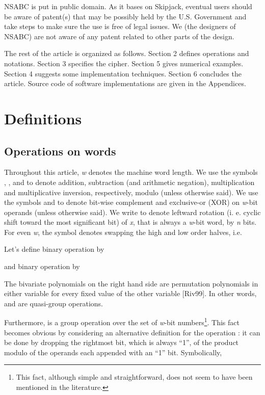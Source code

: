\documentclass[a4paper,oneside,english]{amsart}
\numberwithin{equation}{section}
\numberwithin{figure}{section}
\begin{document}
NSABC is put in public domain. As it bases on Skipjack, eventual users
should be aware of patent(s) that may be possibly held by the U.S.
Government and take steps to make sure the use is free of legal issues.
We (the designers of NSABC) are not aware of any patent related to
other parts of the design.

The rest of the article is organized as follows. Section 2 defines
operations and notations. Section 3 specifies the cipher. Section
5 gives numerical examples. Section 4 suggests some implementation
techniques. Section 6 concludes the article. Source code of software
implementations are given in the Appendices.


\section{Definitions}


\subsection{Operations on words}

Throughout this article, \emph{w} denotes the machine word length.
We use the symbols , ,  and 
to denote addition, subtraction (and arithmetic negation), multiplication
and multiplicative inversion, respectively, modulo  (unless
otherwise said). We use the symbols  and  to denote
bit-wise complement and exclusive-or (XOR)\emph{ }on \emph{w}-bit
operands (unless otherwise said). We write  to denote leftward
rotation (i. e. cyclic shift toward the most significant bit) of \emph{x},
that is always a \emph{w}-bit word, by \emph{n} bits. For even \emph{w},
the symbol  denotes swapping the high and low order
halves, i.e. 

Let's define binary operation  by




and binary operation  by




The bivariate polynomials on the right hand side are permutation polynomials
in either variable for every fixed value of the other variable {[}Riv99{]}.
In other words,  and  are quasi-group operations.

Furthermore,  is a group operation over the set of \emph{w}-bit
numbers\footnote{This fact, although simple and straightforward, does not seem to have
been mentioned in the literature.}. This fact becomes obvious by considering an alternative definition
for the  operation \cite{Mey97}: it can be done by dropping
the rightmost bit, which is always {}``1'', of the product modulo
 of the operands each appended with an {}``1'' bit. Symbolically,
\end{document}
